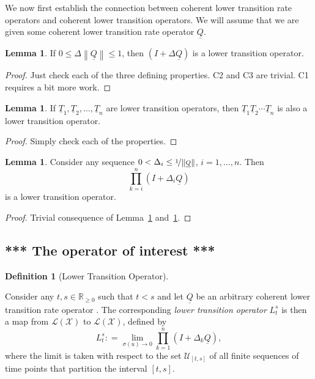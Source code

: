 \documentclass[10pt]{paper}
\theoremstyle{definition}
\newtheorem{lemma}[theorem]{Lemma}
\newtheorem{definition}{Definition}
\newcommand{\reals}{\mathbb{R}}
\newcommand{\realsnonneg}{\reals_{\geq 0}}
\newcommand{\states}{\mathcal{X}}
\newcommand{\lt}{\underline{T}}
\newcommand{\lbound}{L}
\newcommand{\gambles}{\mathcal{L}}
\newcommand{\gamblesX}{\gambles(\states)}
\newcommand{\lrate}{\underline{Q}}
\newcommand{\norm}[1]{\left\lVert #1 \right\rVert}
\newcommand{\coloneqq}{:\!=}
\begin{document}
We now first establish the connection between coherent lower transition rate operators and coherent lower transition operators. We will assume that we are given some coherent lower transition rate operator $\lrate$.

\begin{lemma}\label{lemma:normQsmallenough}
If $0\leq\Delta\norm{\lrate}\leq1$, then $(I+\Delta\lrate)$ is a lower transition operator.
\end{lemma}
\begin{proof}
Just check each of the three defining properties. C2 and C3 are trivial. C1 requires a bit more work.
\end{proof}

\begin{lemma}\label{lemma:compositioncoherence}
If $\lt_1,\lt_2,\dots,\lt_n$ are lower transition operators, then  $\lt_1\lt_2\cdots\lt_n$ is also a lower transition operator.
\end{lemma}
\begin{proof}
Simply check each of the properties.
\end{proof}

\begin{lemma}\label{lemma:productiscoherent}
Consider any sequence $0<\Delta_i\leq\nicefrac{1}{\norm{\lrate}}$, $i=1,\dots,n$. Then
\begin{equation*}
\prod_{k=i}^n(I+\Delta_i\lrate)
\end{equation*}
is a lower transition operator.
\end{lemma}
\begin{proof}
Trivial consequence of Lemma~\ref{lemma:normQsmallenough} and~\ref{lemma:compositioncoherence}.
\end{proof}

\subsection{*** The operator of interest ***}

\begin{definition}[Lower Transition Operator]\label{def:low_trans}

Consider any $t,s\in\realsnonneg$ such that $t<s$ and let $\lrate$ be an arbitrary coherent lower transition rate operator . The corresponding \emph{lower transition operator} $\lbound_t^s$ is then a map from $\gamblesX$ to $\gamblesX$, defined by
\begin{equation}\label{eq:lowerbound}
\lbound_t^s\coloneqq\lim_{\sigma(u)\to0}\prod_{k=1}^n(I+\Delta_k\lrate),
\end{equation}
where the limit is taken with respect to the set $\mathcal{U}_{[t,s]}$ of all finite sequences of time points that partition the interval $[t,s]$.
\end{definition}
\end{document}
